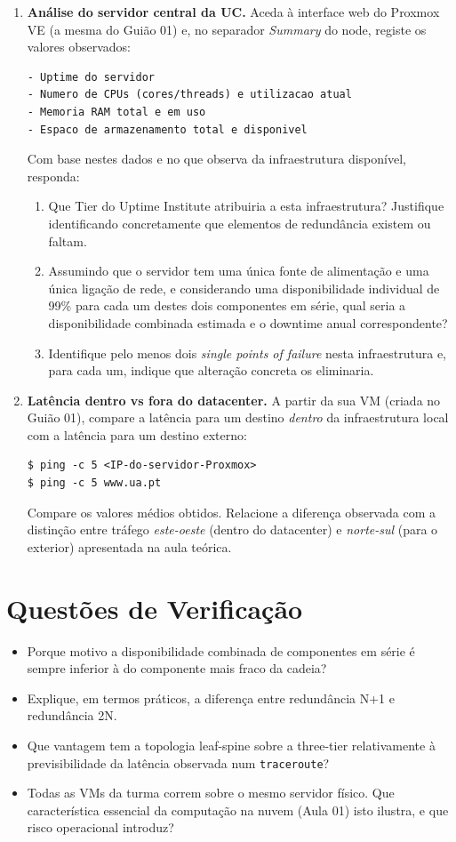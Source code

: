 \documentclass[11pt,a4paper]{article}
\begin{document}
\begin{enumerate}[label=\arabic*.]
  \item \textbf{Análise do servidor central da UC.} Aceda à interface web do Proxmox VE (a mesma do Guião 01) e, no separador \emph{Summary} do node, registe os valores observados:
\begin{lstlisting}
- Uptime do servidor
- Numero de CPUs (cores/threads) e utilizacao atual
- Memoria RAM total e em uso
- Espaco de armazenamento total e disponivel
\end{lstlisting}
  Com base nestes dados e no que observa da infraestrutura disponível, responda:
  \begin{enumerate}[label=\alph*)]
    \item Que Tier do Uptime Institute atribuiria a esta infraestrutura? Justifique identificando concretamente que elementos de redundância existem ou faltam.
    \item Assumindo que o servidor tem uma única fonte de alimentação e uma única ligação de rede, e considerando uma disponibilidade individual de 99\% para cada um destes dois componentes em série, qual seria a disponibilidade combinada estimada e o downtime anual correspondente?
    \item Identifique pelo menos dois \emph{single points of failure} nesta infraestrutura e, para cada um, indique que alteração concreta os eliminaria.
  \end{enumerate}
  \vspace{1cm}

  \item \textbf{Latência dentro vs fora do datacenter.} A partir da sua VM (criada no Guião 01), compare a latência para um destino \emph{dentro} da infraestrutura local com a latência para um destino externo:
\begin{lstlisting}
$ ping -c 5 <IP-do-servidor-Proxmox>
$ ping -c 5 www.ua.pt
\end{lstlisting}
  Compare os valores médios obtidos. Relacione a diferença observada com a distinção entre tráfego \emph{este-oeste} (dentro do datacenter) e \emph{norte-sul} (para o exterior) apresentada na aula teórica.
\end{enumerate}

\section{Questões de Verificação}
\begin{itemize}[itemsep=0.2cm]
  \item Porque motivo a disponibilidade combinada de componentes em série é sempre inferior à do componente mais fraco da cadeia?
  \item Explique, em termos práticos, a diferença entre redundância N+1 e redundância 2N.
  \item Que vantagem tem a topologia leaf-spine sobre a three-tier relativamente à previsibilidade da latência observada num \texttt{traceroute}?
  \item Todas as VMs da turma correm sobre o mesmo servidor físico. Que característica essencial da computação na nuvem (Aula 01) isto ilustra, e que risco operacional introduz?
\end{itemize}
\end{document}
